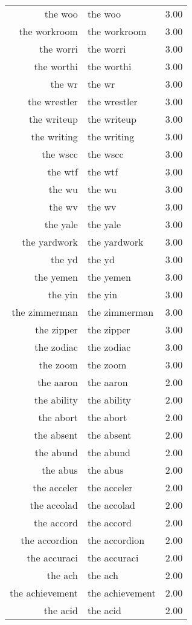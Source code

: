 \begin{table}[ht]
\begin{tabular}{rlr}
  the woo & the woo & 3.00 \\ 
  the workroom & the workroom & 3.00 \\ 
  the worri & the worri & 3.00 \\ 
  the worthi & the worthi & 3.00 \\ 
  the wr & the wr & 3.00 \\ 
  the wrestler & the wrestler & 3.00 \\ 
  the writeup & the writeup & 3.00 \\ 
  the writing & the writing & 3.00 \\ 
  the wscc & the wscc & 3.00 \\ 
  the wtf & the wtf & 3.00 \\ 
  the wu & the wu & 3.00 \\ 
  the wv & the wv & 3.00 \\ 
  the yale & the yale & 3.00 \\ 
  the yardwork & the yardwork & 3.00 \\ 
  the yd & the yd & 3.00 \\ 
  the yemen & the yemen & 3.00 \\ 
  the yin & the yin & 3.00 \\ 
  the zimmerman & the zimmerman & 3.00 \\ 
  the zipper & the zipper & 3.00 \\ 
  the zodiac & the zodiac & 3.00 \\ 
  the zoom & the zoom & 3.00 \\ 
  the aaron & the aaron & 2.00 \\ 
  the ability & the ability & 2.00 \\ 
  the abort & the abort & 2.00 \\ 
  the absent & the absent & 2.00 \\ 
  the abund & the abund & 2.00 \\ 
  the abus & the abus & 2.00 \\ 
  the acceler & the acceler & 2.00 \\ 
  the accolad & the accolad & 2.00 \\ 
  the accord & the accord & 2.00 \\ 
  the accordion & the accordion & 2.00 \\ 
  the accuraci & the accuraci & 2.00 \\ 
  the ach & the ach & 2.00 \\ 
  the achievement & the achievement & 2.00 \\ 
  the acid & the acid & 2.00 \\ 

\end{tabular}
\end{table}

